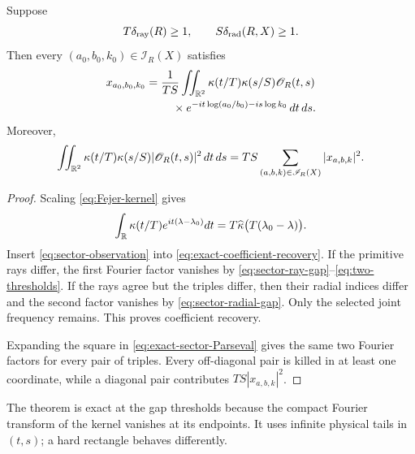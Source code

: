 \begin{theorem}
\label{thm:exact-sector-recovery}
Suppose
\begin{equation}
 T\delta_{\rm ray}(R)\geq1,
 \qquad
 S\delta_{\rm rad}(R,X)\geq1.
 \label{eq:two-thresholds}
\end{equation}
Then every $(a_0,b_0,k_0)\in\mathscr I_R(X)$ satisfies
\begin{equation}
 \begin{aligned}
 x_{a_0,b_0,k_0}
 ={}&\frac1{TS}\iint_{\mathbb R^2}
 \kappa(t/T)\kappa(s/S)\mathscr O_R(t,s)\\
 &\quad\times
 e^{-it\log(a_0/b_0)-is\log k_0}\,dt\,ds.
 \end{aligned}
 \label{eq:exact-coefficient-recovery}
\end{equation}
Moreover,
\begin{equation}
 \iint_{\mathbb R^2}
 \kappa(t/T)\kappa(s/S)|\mathscr O_R(t,s)|^2\,dt\,ds
 =TS\sum_{(a,b,k)\in\mathscr I_R(X)}|x_{a,b,k}|^2.
 \label{eq:exact-sector-Parseval}
\end{equation}
\end{theorem}

\begin{proof}
Scaling \eqref{eq:Fejer-kernel} gives
\begin{equation}
 \int_\mathbb R\kappa(t/T)e^{it(\lambda-\lambda_0)}dt
 =T\widehat\kappa\bigl(T(\lambda_0-\lambda)\bigr).
 \label{eq:scaled-Fejer-transform}
\end{equation}
Insert \eqref{eq:sector-observation} into
\eqref{eq:exact-coefficient-recovery}.  If the primitive rays differ,
the first Fourier factor vanishes by
\eqref{eq:sector-ray-gap}--\eqref{eq:two-thresholds}.  If the rays agree
but the triples differ, then their radial indices differ and the second
factor vanishes by \eqref{eq:sector-radial-gap}.  Only the selected joint
frequency remains.  This proves coefficient recovery.

Expanding the square in \eqref{eq:exact-sector-Parseval} gives the same
two Fourier factors for every pair of triples.  Every off-diagonal pair
is killed in at least one coordinate, while a diagonal pair contributes
$TS|x_{a,b,k}|^2$.
\end{proof}

The theorem is exact at the gap thresholds because the compact Fourier
transform of the kernel vanishes at its endpoints.  It uses infinite
physical tails in $(t,s)$; a hard rectangle behaves differently.

